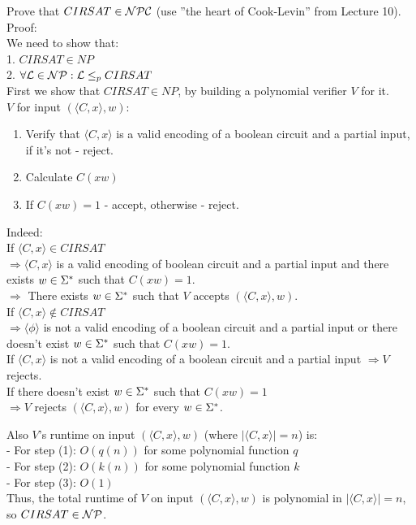 Prove that $CIRSAT \in \mathcal{N}\mathcal{P}\mathcal{C}$ (use ”the heart of Cook-Levin” from Lecture 10).  \\

Proof: \\
We need to show that: \\
1. $CIRSAT \in NP$ \\
2. $\forall \mathcal{L} \in \mathcal{N}\mathcal{P}: \mathcal{L} \leq_p CIRSAT$ \\

First we show that $CIRSAT \in NP$, by building a polynomial verifier $V$ for it. \\
$V$ for input $(\langle C, x \rangle, w)$:
\begin{enumerate}[1., itemsep=5pt]
    \item Verify that $\langle C, x \rangle$ is a valid encoding of a boolean circuit and a partial input, if it's not - reject.

    \item Calculate $C(xw)$

    \item If $C(xw)=1$ - accept, otherwise - reject.

\end{enumerate}

Indeed: \\
If $\langle C, x \rangle \in CIRSAT$ \\
$\Rightarrow \langle C, x \rangle$ is a valid encoding of boolean circuit and a partial input
and there exists $w \in \Sigma^*$ such that $C(xw)=1$. \\
$\Rightarrow $ There exists $w \in \Sigma^*$ such that $V$ accepts $(\langle C, x \rangle, w)$. \\

If $\langle C, x \rangle \notin CIRSAT$ \\
$\Rightarrow \langle \phi \rangle$ is not a valid encoding of a boolean circuit and a partial input
or there doesn't exist $w \in \Sigma^*$ such that $C(xw)=1$. \\
If $\langle C, x \rangle$ is not a valid encoding of a boolean circuit and a partial input $\Rightarrow V$ rejects. \\
If there doesn't exist $w \in \Sigma^*$ such that $C(xw)=1$ \\
$\Rightarrow V$ rejects $(\langle C, x \rangle, w)$ for every $w \in \Sigma^*$.

Also $V$'s runtime on input $(\langle C, x \rangle, w)$ (where $|\langle C, x \rangle|=n$) is: \\
- For step (1): $O(q(n))$ for some polynomial function $q$ \\
- For step (2): $O(k(n))$ for some polynomial function $k$ \\
- For step (3): $O(1)$ \\
Thus, the total runtime of $V$ on input  $(\langle C, x \rangle, w)$ is polynomial in $|\langle C, x \rangle|=n$, so \underline{$CIRSAT \in \mathcal{N}\mathcal{P}$}. \\

